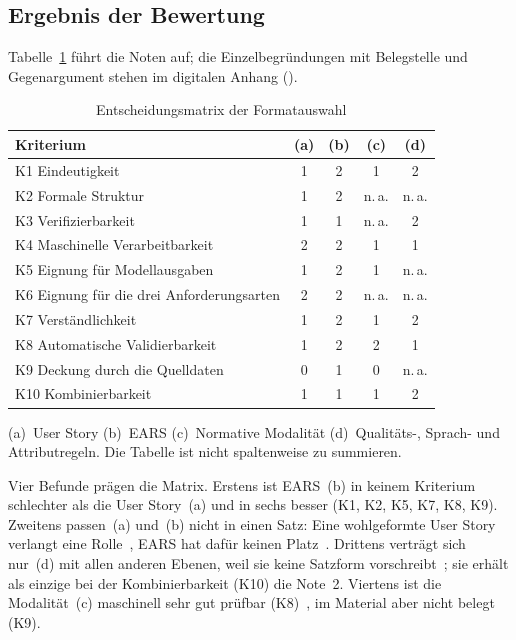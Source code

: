 \documentclass[11pt,a4paper]{report}
\begin{document}
\subsection{Ergebnis der Bewertung}
\label{subsec:bewertungsergebnis}

Tabelle~\ref{tab:entscheidungsmatrix} führt die Noten auf; die
Einzelbegründungen mit Belegstelle und Gegenargument stehen im
digitalen Anhang ().

\begin{table}[htbp]
  \centering
  \caption{Entscheidungsmatrix der Formatauswahl}
  \label{tab:entscheidungsmatrix}
  \begin{tabular}{@{}>{\raggedright\arraybackslash}p{5.4cm}cccc@{}}
    \toprule
    \textbf{Kriterium} & \textbf{(a)} & \textbf{(b)} & \textbf{(c)} &
    \textbf{(d)} \\
    \midrule
    K1 Eindeutigkeit                        & 1 & 2 & 1 & 2 \\
    K2 Formale Struktur                     & 1 & 2 & n.\,a. & n.\,a. \\
    K3 Verifizierbarkeit                    & 1 & 1 & n.\,a. & 2 \\
    K4 Maschinelle Verarbeitbarkeit         & 2 & 2 & 1 & 1 \\
    K5 Eignung für Modellausgaben           & 1 & 2 & 1 & n.\,a. \\
    K6 Eignung für die drei Anforderungsarten & 2 & 2 & n.\,a. & n.\,a. \\
    K7 Verständlichkeit                     & 1 & 2 & 1 & 2 \\
    K8 Automatische Validierbarkeit         & 1 & 2 & 2 & 1 \\
    K9 Deckung durch die Quelldaten         & 0 & 1 & 0 & n.\,a. \\
    K10 Kombinierbarkeit                    & 1 & 1 & 1 & 2 \\
    \bottomrule
  \end{tabular}

  \vspace{0.5em}
  \footnotesize
  (a)~User Story \quad (b)~EARS \quad (c)~Normative Modalität \quad
  (d)~Qualitäts-, Sprach- und Attributregeln. Die Tabelle ist nicht
  spaltenweise zu summieren.
\end{table}

Vier Befunde prägen die Matrix. Erstens ist EARS~(b) in keinem Kriterium
schlechter als die User Story~(a) und in sechs besser (K1, K2, K5, K7,
K8, K9). Zweitens passen~(a) und~(b) nicht in einen Satz: Eine
wohlgeformte User Story verlangt eine Rolle~\cite[Tab.~1]{lucassen2016qus},
EARS hat dafür keinen Platz~\cite[Abschn.~4.1]{mavin2009ears}. Drittens
verträgt sich nur~(d) mit allen anderen Ebenen, weil sie keine Satzform
vorschreibt~\cite[Abschn.~5.2.4 NOTE~2]{iso29148}; sie erhält als einzige
bei der Kombinierbarkeit (K10) die Note~2. Viertens ist die Modalität~(c)
maschinell sehr gut prüfbar (K8)~\cite[Abschn.~2]{rfc8174}, im Material
aber nicht belegt (K9).
\end{document}
